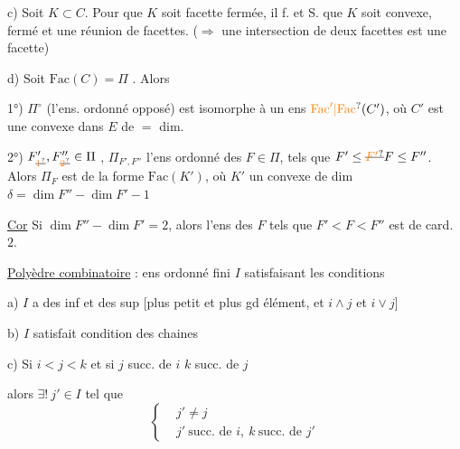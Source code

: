 c) Soit  $K\subset C$. Pour que $K$ soit  facette
fermée, il f. et S. que $K$ soit convexe, fermé et
une réunion de facettes. ($\Rightarrow$ une intersection
de deux facettes est une facette)

d)  Soit $\mathrm{Fac}(C)=\Pi$ . Alors

1°) $\Pi^\circ$ (l'ens. ordonné opposé) est isomorphe
à un ens $\unsure{\mathrm{Fac}'|\mathrm{Fac}}(C')$, où $C'$ est une
 convexe  dans $E$ de $=$ dim.

2°)  $F'_{\deleted{\unsure{1}}},F''_{\deleted{\unsure{2}}}\in\Pi$ , $\Pi_{F',F''}$ l'ens ordonné des $F\in\Pi$, tels que $F'\leq \deleted{\unsure{F'}}F\leq F''$. Alors $\Pi_F$
est  de la forme  $\mathrm{Fac}(K')$, où
$K'$ un  convexe de dim $\delta=\dim F''-\dim F'-1$

\uline{Cor} Si  $\dim F''-\dim F'=2$, alors  l'ens
des $F$ tels que $F'<F<F''$ est de card. $2$.


\uline{Polyèdre combinatoire} : ens ordonné
fini $I$ satisfaisant les conditions

a) $I$ a des inf et des sup 
[plus petit et plus gd élément, et
$i\wedge j$ et $i\vee j$]

b) $I$ satisfait condition des chaines

c) Si $i<j<$$k$ et si $j$ succ.  de $i$
$k$ succ. de $j$

alors $\exists!\ j'\in I$ tel que
\[
\left\{\begin{aligned}
&j'\ne j\\
&j'\ \text{succ. de }i,\ k\ \text{succ. de }j'
\end{aligned}\right.
\]


